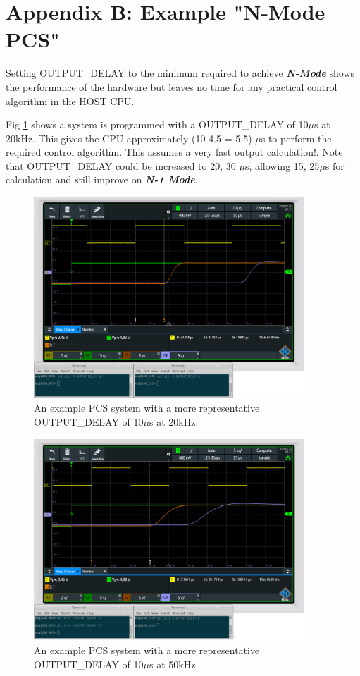 \documentclass{article}
\begin{document}
\newpage

\section{Appendix B: Example "N-Mode PCS"} \label{nmodepcs}

Setting OUTPUT\_DELAY to the minimum required to achieve \textit{\textbf{N-Mode}} shows the performance of the hardware but leaves no time for any practical control algorithm in the HOST CPU.



Fig \ref{20repscope} shows a system is programmed with a OUTPUT\_DELAY of 10$\mu$s at 20kHz.
This gives the CPU approximately (10-4.5 = 5.5) $\mu$s to perform the required control algorithm.
This assumes a very fast output calculation!.
Note that OUTPUT\_DELAY could be increased to 20, 30 $\mu$s, allowing 15, 25$\mu$s for calculation and still improve on \textit{\textbf{N-1 Mode}}.

\begin{figure} [htb!]
	\centering
	\includegraphics[width=4.0in]{images/n-mode-pcs-scope-trace-20kHz-2.png}
	\caption{An example PCS system with a more representative OUTPUT\_DELAY of 10$\mu$s at 20kHz.}
	\label{20repscope}
\end{figure}

\begin{figure} [htb!]
	\centering
	\includegraphics[width=4.0in]{images/n-mode-pcs-scope-trace-50kHz-2.png}
	\caption{An example PCS system with a more representative OUTPUT\_DELAY of 10$\mu$s at 50kHz.}
	\label{50repscope}
\end{figure}
\end{document}
